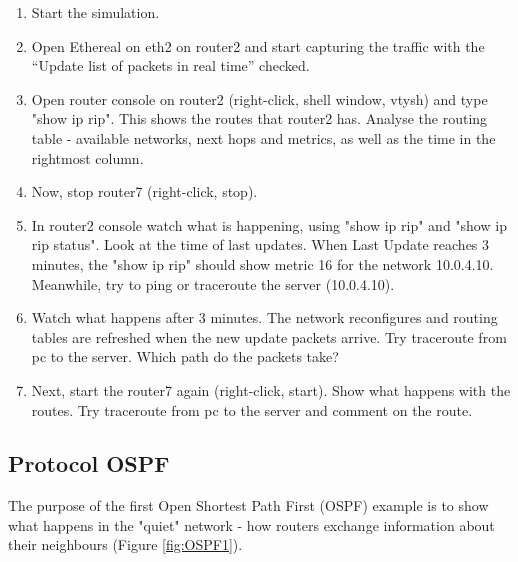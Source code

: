 \begin{enumerate}
 \item	Start the simulation.
 \item	Open Ethereal on eth2 on router2 and start capturing the traffic with
the ``Update list of packets in real time'' checked.
 \item	Open router console on router2 (right-click, shell window, vtysh) and
type "show ip rip". This shows the routes that router2 has. Analyse the routing
table - available networks, next hops and metrics, as well as the time in the
rightmost column.
 \item	Now, stop router7 (right-click, stop). 
 \item	In router2 console watch what is happening, using "show ip rip" and
"show ip rip status". Look at the time of last updates. When Last Update
reaches 3 minutes, the "show ip rip" should show metric 16 for the network
10.0.4.10. Meanwhile, try to ping or traceroute the server (10.0.4.10).
 \item	Watch what happens after 3 minutes. The network reconfigures and
routing tables are refreshed when the new update packets arrive. Try traceroute
from pc to the server. Which path do the packets take?
 \item	Next, start the router7 again (right-click, start). Show what happens
with the routes. Try traceroute from pc to the server and comment on the route.
\end{enumerate}

\subsection{Protocol OSPF}

The purpose of the first Open Shortest Path First (OSPF) example is to show
what happens in the "quiet" network - how routers exchange information about
their neighbours (Figure \ref{fig:OSPF1}).


